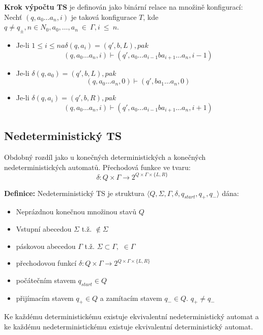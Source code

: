 \documentclass[10pt,a4paper]{article}
\theoremstyle{note}
\begin{document}
		\textbf{Krok výpočtu TS} je definován jako binární relace na množině konfigurací: Nechť $(q,a_{0} \dots a_{n}, i) $
		je taková konfigurace $T$, kde $q \neq q_{\pm}, n \in N_{0}, a_{0}, \dots, a_{n}~\in~\Gamma, i~\leq~n. $
		\begin{itemize}
			\item Je-li $1 \leq i \leq n a \delta(q,a_{i}) = (q', b, L), pak$
				$$(q,a_{0} \dots a_{n}, i) \vdash (q', a_{0} \dots a_{i-1}ba_{i+1} \dots a_{n}, i-1) $$
			\item Je-li $\delta(q,a_{0}) = (q', b, L), pak$
				$$(q,a_{0} \dots a_{n}, 0) \vdash (q', ba_{1} \dots a_{n}, 0) $$
			\item Je-li $\delta(q,a_{i}) = (q', b, R), pak$
				$$(q,a_{0} \dots a_{n}, i) \vdash (q', a_{0} \dots a_{i-1}ba_{i+1} \dots a_{n}, i+1) $$
		\end{itemize}



	\subsection{Nedeterministický TS}

		Obdobný rozdíl jako u konečných deterministických a konečných nedeterministických automatů. Přechodová funkce ve 				tvaru:
		$$\delta : Q \times  \Gamma \rightarrow 2^{Q \times \Gamma \times \{L , R \}}$$

		\textbf{Definice: }
		Nedeterministický TS je struktura $\langle Q, \Sigma, \Gamma, \delta, q_{start}, q_{+}, q_{-} \rangle $ dána:
		\begin{itemize}
			\item Neprázdnou konečnou množinou stavů $Q$
			\item Vstupní abecedou  $\Sigma$ t.ž. \textvisiblespace $ \notin \Sigma$
			\item páskovou abecedou $\Gamma$ t.ž. $\Sigma \subset \Gamma,$ \textvisiblespace $\in  \Gamma $
			\item přechodovou funkcí $\delta : Q \times  \Gamma \rightarrow 2^{Q \times \Gamma \times \{L , R \}} $
			\item počátečním stavem $q_{start} \in Q$
			\item přijímacím stavem $q_{+} \in Q $ a zamítacím stavem $q_{-} \in Q.$ $q_{+} \neq q_{-}$
		\end{itemize}

		Ke každému deterministickému existuje ekvivalentní nedeterministický automat a ke každému
		nedeterministickému existuje ekvivalentní deterministický automat.
\end{document}
